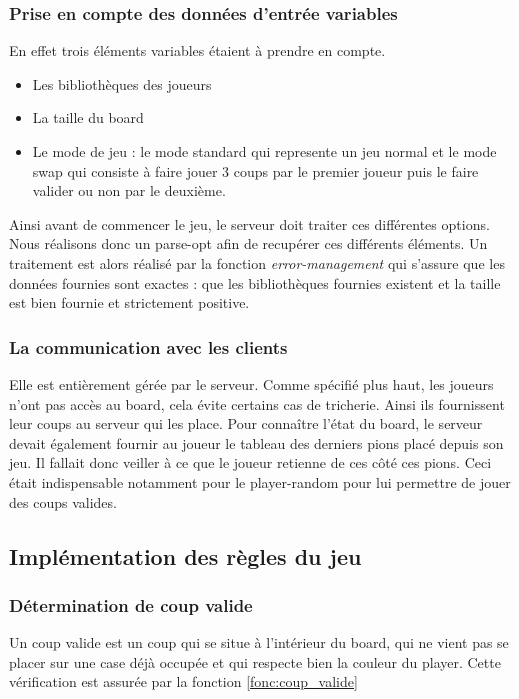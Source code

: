 \documentclass[12pt]{article}
\begin{document}
\subsubsection{Prise en compte des données d'entrée variables}
En effet trois éléments variables étaient à prendre en compte.
\begin{itemize}
    \item Les bibliothèques des joueurs
    \item La taille du board
    \item Le mode de jeu : le mode standard qui represente un jeu normal et le mode swap qui consiste à faire jouer 3 coups par le premier joueur puis le faire valider ou non par le deuxième.
\end{itemize}
Ainsi avant de commencer le jeu, le serveur doit traiter ces différentes options. Nous réalisons donc un parse-opt afin de recupérer ces différents éléments. Un traitement est alors réalisé par la fonction \textit{error-management} qui s'assure que les données fournies sont exactes : que les bibliothèques fournies existent et la taille est bien fournie et strictement positive.

\subsubsection{La communication avec les clients}

Elle est entièrement gérée par le serveur. Comme spécifié plus haut, les joueurs n'ont pas accès au board, cela évite certains cas de tricherie. Ainsi ils fournissent leur coups au serveur qui les place. Pour connaître l'état du board, le serveur devait également fournir au joueur le tableau des derniers pions placé depuis son jeu. Il fallait donc veiller à ce que le joueur retienne de ces côté ces pions. Ceci était indispensable notamment pour le player-random pour lui permettre de jouer des coups valides.

\subsection{Implémentation des règles du jeu}
\subsubsection{Détermination de coup valide}

Un coup valide est un coup qui se situe à l'intérieur du board, qui ne vient pas se placer sur une case déjà occupée et qui respecte bien la couleur du player. Cette vérification est assurée par la fonction \ref{fonc:coup_valide}
\end{document}
